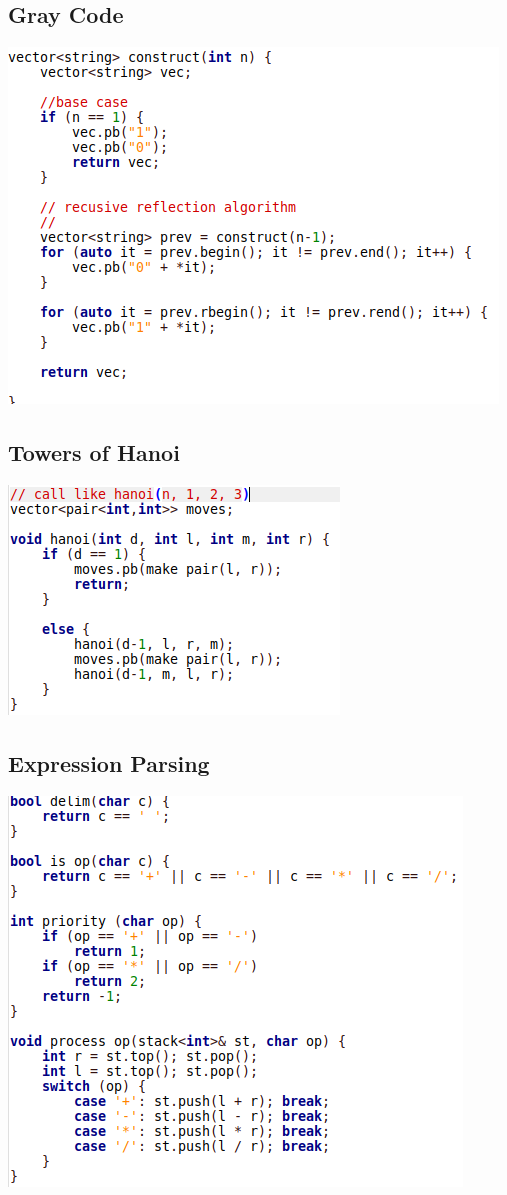 \documentclass[11pt,twocolumn]{article}
\begin{document}
\subsection{Gray Code}

\includegraphics[scale=0.5]{graycode}

\subsection{Towers of Hanoi}
\includegraphics[scale=0.5]{hanoi}

\subsection{Expression Parsing}

\includegraphics[scale=0.5]{parsea}
\end{document}
